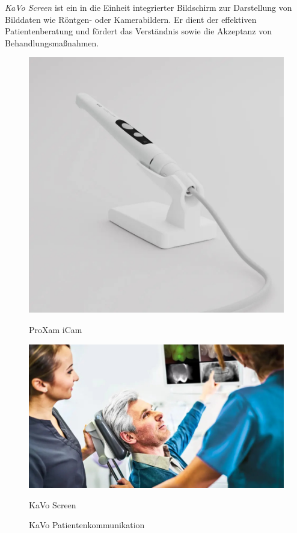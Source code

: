 \textit{KaVo Screen} ist ein in die Einheit integrierter Bildschirm zur Darstellung von Bilddaten wie Röntgen- oder Kamerabildern. Er dient der effektiven Patientenberatung und fördert das Verständnis sowie die Akzeptanz von Behandlungsmaßnahmen.
\vspace{3em}
\begin{figure}[H]
  \centering
  \begin{minipage}[b]{0.45\textwidth}
    \centering
    \includegraphics[width=\textwidth]{images/ProXam-iCam_table_background-1-1.jpg}
    \caption*{ProXam iCam}
  \end{minipage}
  \hspace{0.05\textwidth}
  \begin{minipage}[b]{0.45\textwidth}
    \centering
    \includegraphics[width=\textwidth]{images/KaVo-uniQa_CONEXIO-Team_1000px.jpg}
    \caption*{KaVo Screen}
  \end{minipage}
  \caption{KaVo Patientenkommunikation}
  \label{fig:Patientenkommunikation und Vernetzung}
\end{figure}
